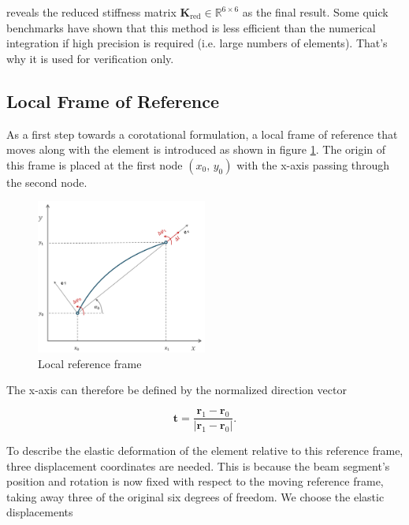 reveals the reduced stiffness matrix $\boldsymbol{K}_{\mathrm{red}} \in \mathbb{R}^{6 \times 6}$ as the final result.
Some quick benchmarks have shown that this method is less efficient than the numerical integration if high precision is required (i.e. large numbers of elements).
That's why it is used for verification only.

\newpage
\subsection{Local Frame of Reference}

As a first step towards a corotational formulation, a local frame of reference that moves along with the element is introduced as shown in figure \ref{fig:beam-element-frame}.
The origin of this frame is placed at the first node $(x_0,\,y_0)$ with the x-axis passing through the second node.

\begin{figure}[h]
\centering
\includegraphics[width=0.5\textwidth]{figures/elements/beam-element-frame.pdf}
\caption{Local reference frame}
\label{fig:beam-element-frame}
\end{figure}

The x-axis can therefore be defined by the normalized direction vector

\begin{equation}
\boldsymbol{t} = \frac{\boldsymbol{r}_1 - \boldsymbol{r}_0}{\left|\boldsymbol{r}_1 - \boldsymbol{r}_0\right|}.
\end{equation}

To describe the elastic deformation of the element relative to this reference frame, three displacement coordinates are needed.
This is because the beam segment's position and rotation is now fixed with respect to the moving reference frame, taking away three of the original six degrees of freedom.
We choose the elastic displacements

